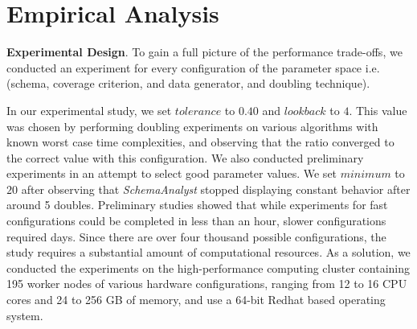 
\section{Empirical Analysis}

\textbf{Experimental Design}. To gain a full picture of the performance trade-offs, we conducted an experiment for every configuration
of the parameter space i.e. (schema, coverage criterion, and data generator, and doubling technique). 

In our experimental study, we set $\mathit{tolerance}$ to $0.40$ and
$\mathit{lookback}$ to $4$. This value was chosen by performing doubling
experiments on various algorithms with known worst case time complexities, and observing that the ratio converged to the
correct value with this configuration.  We also conducted preliminary
experiments in an attempt to select good parameter values. We set $\mathit{minimum}$ to $20$ after observing that
\textit{SchemaAnalyst} stopped displaying constant behavior after around 5 doubles.  Preliminary studies showed that
while experiments for fast configurations could be completed in less than an hour, slower configurations required days.
Since there are over four thousand possible configurations, the study requires a substantial amount of computational
resources.  As a solution, we conducted the experiments on the high-performance computing cluster containing 195 worker
nodes of various hardware configurations, ranging from 12 to 16 CPU cores and 24 to 256 GB of memory, and use a 64-bit
Redhat based operating system.
